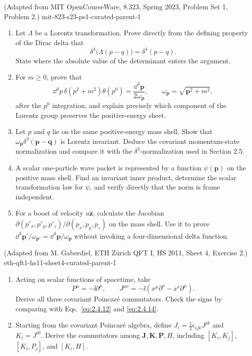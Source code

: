 
\begin{enumerate}
  {(Adapted from MIT OpenCourseWare, 8.323, Spring 2023, Problem Set 1, Problem 2.)}
  {mit-823-s23-ps1-curated-parent-1}
\begin{enumerate}
\item
Let \(\Lambda\) be a Lorentz transformation.  Prove directly from the
defining property of the Dirac delta that
\[
 \delta^4\!\bigl(\Lambda(p-q)\bigr)=\delta^4(p-q).
\]
State where the absolute value of the determinant enters the argument.
\item
For \(m\geq0\), prove that
\[
 \dd^4p\,\delta(p^2+m^2)\theta(p^0)
   =\frac{\dd^3\mathbf p}{2\omega_{\mathbf p}},
 \qquad \omega_{\mathbf p}=\sqrt{\mathbf p^2+m^2},
\]
after the \(p^0\) integration, and explain precisely which component of the
Lorentz group preserves the positive-energy sheet.
\item
Let \(p\) and \(q\) lie on the same positive-energy mass shell.  Show that
\(\omega_{\mathbf p}\delta^3(\mathbf p-\mathbf q)\) is Lorentz invariant.  Deduce
the covariant momentum-state normalization and compare it with the
\(\delta^3\)-normalization used in Section 2.5.
\item
A scalar one-particle wave packet is represented by a function
\(\psi(\mathbf p)\) on the positive mass shell.  Find an invariant inner
product, determine the scalar transformation law for \(\psi\), and verify
directly that the norm is frame independent.
\item
For a boost of velocity \(u\widehat{\mathbf z}\), calculate the Jacobian
\(\partial(p'_x,p'_y,p'_z)/\partial(p_x,p_y,p_z)\) on the mass shell.
Use it to prove \(\dd^3\mathbf p'/\omega_{\mathbf p'}=
\dd^3\mathbf p/\omega_{\mathbf p}\) without invoking a four-dimensional delta
function.
\end{enumerate}

  {(Adapted from M. Gaberdiel, ETH Z\"urich QFT I, HS 2011, Sheet 4, Exercise 2.)}
  {eth-qft1-hs11-sheet4-curated-parent-1}
\begin{enumerate}
\item
Acting on scalar functions of spacetime, take
\[
 P^\mu=-\ii\partial^\mu,\qquad
 J^{\mu\nu}=-\ii(x^\mu\partial^\nu-x^\nu\partial^\mu).
\]
Derive all three covariant Poincar\'e commutators.  Check the signs by
comparing with Eqs.~\eqref{eq:2.4.12} and \eqref{eq:2.4.14}.
\item
Starting from the covariant Poincar\'e algebra, define
\(J_i=\frac12\epsilon_{ijk}J^{jk}\) and \(K_i=J^{i0}\).  Derive the
commutators among \(\mathbf J,\mathbf K,\mathbf P,H\), including
\([K_i,K_j]\), \([K_i,P_j]\), and \([K_i,H]\).
\end{enumerate}


\end{enumerate}
